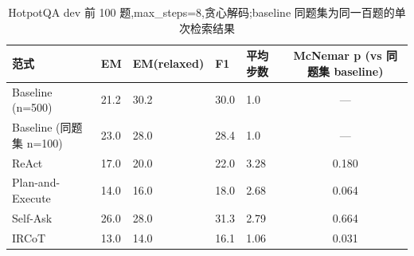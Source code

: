 \begin{table}[htbp]
\centering
\caption{HotpotQA dev 前 100 题,max_steps=8,贪心解码;baseline 同题集为同一百题的单次检索结果}
\begin{tabular}{lllllc}
\toprule
范式 & EM & EM(relaxed) & F1 & 平均步数 & McNemar p (vs 同题集 baseline) \\
\midrule
Baseline (n=500) & 21.2 & 30.2 & 30.0 & 1.0 & — \\
Baseline (同题集 n=100) & 23.0 & 28.0 & 28.4 & 1.0 & — \\
ReAct & 17.0 & 20.0 & 22.0 & 3.28 & 0.180 \\
Plan-and-Execute & 14.0 & 16.0 & 18.0 & 2.68 & 0.064 \\
Self-Ask & 26.0 & 28.0 & 31.3 & 2.79 & 0.664 \\
IRCoT & 13.0 & 14.0 & 16.1 & 1.06 & 0.031 \\
\bottomrule
\end{tabular}
\end{table}
